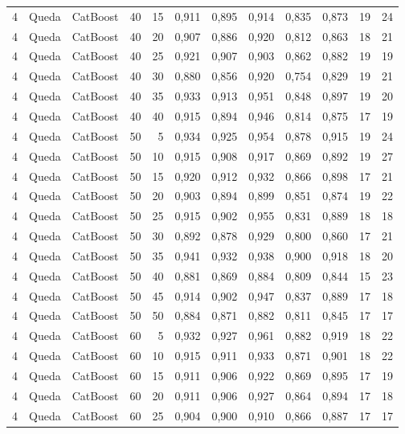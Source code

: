 \begin{longtable}{@{}rllrrrrrrrrr@{}}
4 & Queda & CatBoost & 40 & 15 & 0,911 & 0,895 & 0,914 & 0,835 & 0,873 & 19 & 24 \\
4 & Queda & CatBoost & 40 & 20 & 0,907 & 0,886 & 0,920 & 0,812 & 0,863 & 18 & 21 \\
4 & Queda & CatBoost & 40 & 25 & 0,921 & 0,907 & 0,903 & 0,862 & 0,882 & 19 & 19 \\
4 & Queda & CatBoost & 40 & 30 & 0,880 & 0,856 & 0,920 & 0,754 & 0,829 & 19 & 21 \\
4 & Queda & CatBoost & 40 & 35 & 0,933 & 0,913 & 0,951 & 0,848 & 0,897 & 19 & 20 \\
4 & Queda & CatBoost & 40 & 40 & 0,915 & 0,894 & 0,946 & 0,814 & 0,875 & 17 & 19 \\
4 & Queda & CatBoost & 50 & 5 & 0,934 & 0,925 & 0,954 & 0,878 & 0,915 & 19 & 24 \\
4 & Queda & CatBoost & 50 & 10 & 0,915 & 0,908 & 0,917 & 0,869 & 0,892 & 19 & 27 \\
4 & Queda & CatBoost & 50 & 15 & 0,920 & 0,912 & 0,932 & 0,866 & 0,898 & 17 & 21 \\
4 & Queda & CatBoost & 50 & 20 & 0,903 & 0,894 & 0,899 & 0,851 & 0,874 & 19 & 22 \\
4 & Queda & CatBoost & 50 & 25 & 0,915 & 0,902 & 0,955 & 0,831 & 0,889 & 18 & 18 \\
4 & Queda & CatBoost & 50 & 30 & 0,892 & 0,878 & 0,929 & 0,800 & 0,860 & 17 & 21 \\
4 & Queda & CatBoost & 50 & 35 & 0,941 & 0,932 & 0,938 & 0,900 & 0,918 & 18 & 20 \\
4 & Queda & CatBoost & 50 & 40 & 0,881 & 0,869 & 0,884 & 0,809 & 0,844 & 15 & 23 \\
4 & Queda & CatBoost & 50 & 45 & 0,914 & 0,902 & 0,947 & 0,837 & 0,889 & 17 & 18 \\
4 & Queda & CatBoost & 50 & 50 & 0,884 & 0,871 & 0,882 & 0,811 & 0,845 & 17 & 17 \\
4 & Queda & CatBoost & 60 & 5 & 0,932 & 0,927 & 0,961 & 0,882 & 0,919 & 18 & 22 \\
4 & Queda & CatBoost & 60 & 10 & 0,915 & 0,911 & 0,933 & 0,871 & 0,901 & 18 & 22 \\
4 & Queda & CatBoost & 60 & 15 & 0,911 & 0,906 & 0,922 & 0,869 & 0,895 & 17 & 19 \\
4 & Queda & CatBoost & 60 & 20 & 0,911 & 0,906 & 0,927 & 0,864 & 0,894 & 17 & 18 \\
4 & Queda & CatBoost & 60 & 25 & 0,904 & 0,900 & 0,910 & 0,866 & 0,887 & 17 & 17 \\

\end{longtable}
